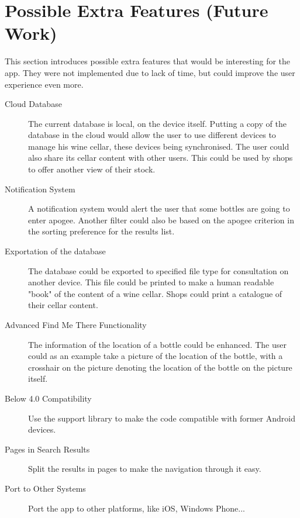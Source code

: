 
\section{Possible Extra Features (Future Work)}

This section introduces possible extra features that would be interesting for the app. They were not implemented due to lack of time, but could improve the user experience even more.

\begin{description}
	\item[Cloud Database] The current database is local, on the device itself. Putting a copy of the database in the cloud would allow the user to use different devices to manage his wine cellar, these devices being synchronised. The user could also share its cellar content with other users. This could be used by shops to offer another view of their stock.
	
	\item[Notification System] A notification system would alert the user that some bottles are going to enter apogee. Another filter could also be based on the apogee criterion in the sorting preference for the results list.
	
	\item[Exportation of the database] The database could be exported to specified file type for consultation on another device. This file could be printed to make a human readable "book" of the content of a wine cellar. Shops could print a catalogue of their cellar content.
	
	\item[Advanced Find Me There Functionality] The information of the location of a bottle could be enhanced. The user could as an example take a picture of the location of the bottle, with a crosshair on the picture denoting the location of the bottle on the picture itself.
	
	\item[Below 4.0 Compatibility] Use the support library to make the code compatible with former Android devices.
	
	\item[Pages in Search Results] Split the results in pages to make the navigation through it easy.
	
	\item[Port to Other Systems] Port the app to other platforms, like iOS, Windows Phone...
\end{description}

